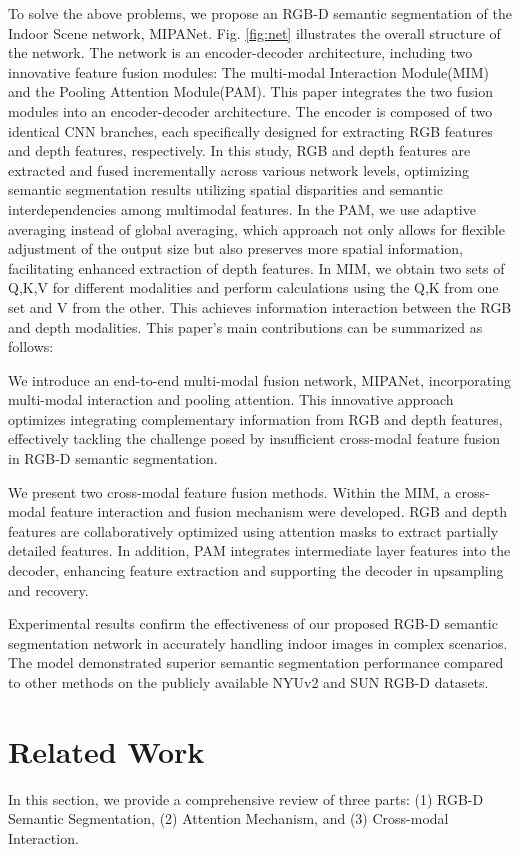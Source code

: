 \documentclass{aims}
\numberwithin{equation}{section}
\begin{document}
To solve the above problems, we propose an RGB-D semantic segmentation of the Indoor Scene network, MIPANet. Fig. \ref{fig:net} illustrates the overall structure of the network. The network is an encoder-decoder architecture, including two innovative feature fusion modules: The multi-modal Interaction Module(MIM) and the Pooling Attention Module(PAM). This paper integrates the two fusion modules into an encoder-decoder architecture. The encoder is composed of two identical CNN branches, each specifically designed for extracting RGB features and depth features, respectively. In this study, RGB and depth features are extracted and fused incrementally across various network levels, optimizing semantic segmentation results utilizing spatial disparities and semantic interdependencies among multimodal features. In the PAM, we use adaptive averaging instead of global averaging, which approach not only allows for flexible adjustment of the output size but also preserves more spatial information, facilitating enhanced extraction of depth features. In MIM, we obtain two sets of Q,K,V for different modalities and perform calculations using the Q,K from one set and V from the other. This achieves information interaction between the RGB and depth modalities. This paper's main contributions can be summarized as follows:

 We introduce an end-to-end multi-modal fusion network, MIPANet, incorporating multi-modal interaction and pooling attention. This innovative approach optimizes integrating complementary information from RGB and depth features, effectively tackling the challenge posed by insufficient cross-modal feature fusion in RGB-D semantic segmentation.

 We present two cross-modal feature fusion methods. Within the MIM, a cross-modal feature interaction and fusion mechanism were developed. RGB and depth features are collaboratively optimized using attention masks to extract partially detailed features. In addition, PAM integrates intermediate layer features into the decoder, enhancing feature extraction and supporting the decoder in upsampling and recovery.

 Experimental results confirm the effectiveness of our proposed RGB-D semantic segmentation network in accurately handling indoor images in complex scenarios. The model demonstrated superior semantic segmentation performance compared to other methods on the publicly available NYUv2 and SUN RGB-D datasets.

\section{Related Work}
In this section, we provide a comprehensive review of three parts: (1) RGB-D Semantic Segmentation, (2) Attention Mechanism, and (3) Cross-modal Interaction.
\end{document}
